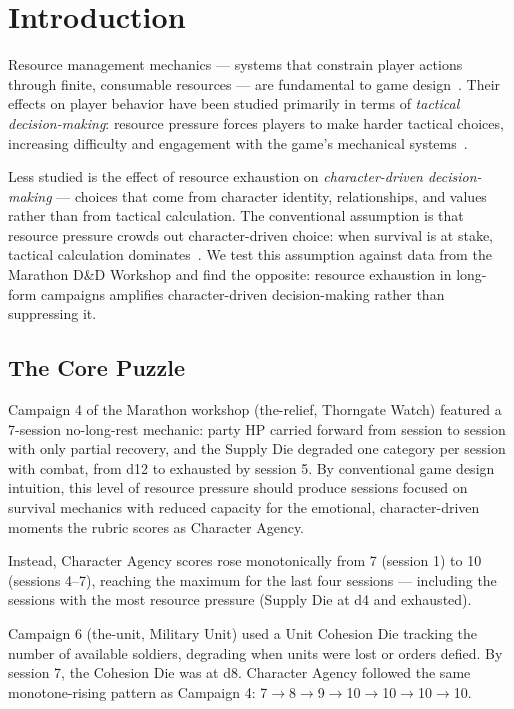 
\section{Introduction}
\label{sec:introduction}

Resource management mechanics --- systems that constrain player actions through
finite, consumable resources --- are fundamental to game design~\cite{juul2005half,
fullerton2008}. Their effects on player behavior have been studied primarily in
terms of \textit{tactical decision-making}: resource pressure forces players to
make harder tactical choices, increasing difficulty and engagement with the
game's mechanical systems~\cite{schell2008art}.

Less studied is the effect of resource exhaustion on \textit{character-driven
decision-making} --- choices that come from character identity, relationships,
and values rather than from tactical calculation. The conventional assumption is
that resource pressure crowds out character-driven choice: when survival is at
stake, tactical calculation dominates~\cite{nacke2011brainhex}. We test this
assumption against data from the Marathon D\&D Workshop and find the opposite:
resource exhaustion in long-form campaigns amplifies character-driven decision-making
rather than suppressing it.

\subsection{The Core Puzzle}

Campaign 4 of the Marathon workshop (the-relief, Thorngate Watch) featured a
7-session no-long-rest mechanic: party HP carried forward from session to session
with only partial recovery, and the Supply Die degraded one category per session
with combat, from d12 to exhausted by session 5. By conventional game design
intuition, this level of resource pressure should produce sessions focused on
survival mechanics with reduced capacity for the emotional, character-driven
moments the rubric scores as Character Agency.

Instead, Character Agency scores rose monotonically from 7 (session 1) to 10
(sessions 4--7), reaching the maximum for the last four sessions --- including
the sessions with the most resource pressure (Supply Die at d4 and exhausted).

Campaign 6 (the-unit, Military Unit) used a Unit Cohesion Die tracking the
number of available soldiers, degrading when units were lost or orders defied.
By session 7, the Cohesion Die was at d8. Character Agency followed the same
monotone-rising pattern as Campaign 4: 7$\to$8$\to$9$\to$10$\to$10$\to$10$\to$10.

